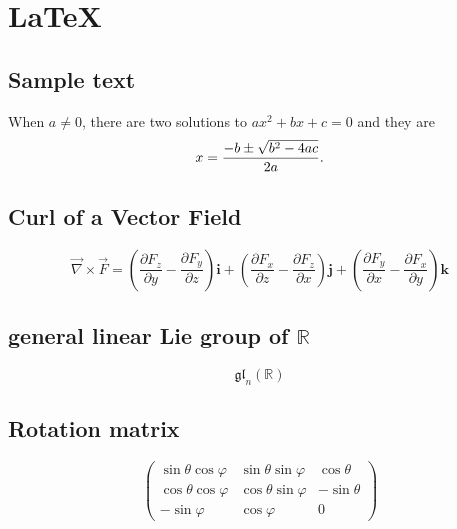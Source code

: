 \documentclass{article}
\begin{document}
\section*{LaTeX}
\subsection*{Sample text}
When \(a \ne 0\), there are two solutions to \(ax^2 + bx + c = 0\) and they are
\[x = {-b \pm \sqrt{b^2-4ac} \over 2a}.\]
\subsection*{Curl of a Vector Field}
\[
	\vec{\nabla} \times \vec{F}
	= \left( \frac{\partial F_z}{\partial y} - \frac{\partial F_y}{\partial z} \right) \mathbf{i}
	+ \left( \frac{\partial F_x}{\partial z} - \frac{\partial F_z}{\partial x} \right) \mathbf{j}
	+ \left( \frac{\partial F_y}{\partial x} - \frac{\partial F_x}{\partial y} \right) \mathbf{k}
\]
\subsection*{general linear Lie group of \(\mathbb{R}\)}
\[\mathfrak{gl}_n(\mathbb{R})\]
\subsection*{Rotation matrix}
\[
	\begin{pmatrix}
		\sin \theta \cos \varphi & \sin \theta \sin \varphi & \cos \theta \\
		\cos \theta \cos \varphi & \cos \theta \sin \varphi & - \sin \theta \\
		- \sin \varphi & \cos \varphi & 0
	\end{pmatrix}
\]
\end{document}
